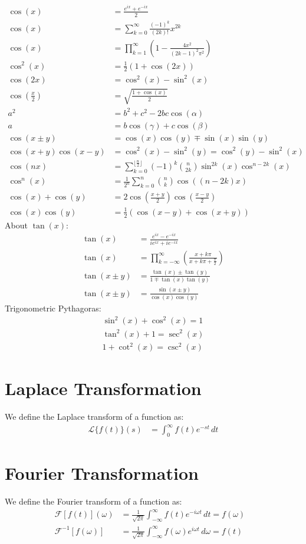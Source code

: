 \documentclass[a4paper,12pt]{article}
\begin{document}
\begin{align*}
\cos(x) &= \frac{e^{ix}+e^{-ix}}{2} \\
\cos(x) &= \sum_{k=0}^{\infty}\frac{(-1)^k}{(2k)!}x^{2k} \\
\cos(x) &= \prod_{k=1}^\infty  \left(1-\frac{4x^2}{(2k-1)^2\pi^2} \right) \\
\cos^2(x) &= \frac{1}{2}(1+\cos(2x)) \\
\cos(2x) &= \cos^2(x) - \sin^2(x)\\
\cos\left(\frac{x}{2}\right) &= \sqrt{\frac{1+\cos(x)}{2}} \\
a^2 &= b^2+c^2-2bc\cos(\alpha) \\
a &= b\cos(\gamma) + c\cos(\beta) \\
\cos(x\pm y) &= \cos(x)\cos(y)\mp\sin(x)\sin(y) \\
\cos(x+y)\cos(x-y)&=\cos^2(x)-\sin^2(y)=\cos^2(y)-\sin^2(x) \\
\cos(nx) &= \sum_{k=0}^{\lfloor\frac{n}{2}\rfloor}(-1)^k{n \choose 2k}\sin^{2k}(x)\cos^{n-2k}(x) \\
\cos^n(x)&= \frac{1}{2^n}\sum_{k=0}^n {n\choose k}\cos\left( (n-2k)x \right) \\
\cos(x)+\cos(y) &= 2\cos\left(\frac{x+y}{2}\right)\cos\left(\frac{x-y}{2}\right) \\
\cos(x)\cos(y) &= \frac{1}{2}\left(\cos(x-y)+\cos(x+y)\right)
\end{align*}
About $\tan(x)$:
\begin{align*}
\tan(x) &= \frac{e^{ix}-e^{-ix}}{ie^{ix}+ie^{-ix}} \\
\tan(x) &= \prod_{k=-\infty}^\infty \left(\frac{x+k\pi}{x+k\pi+\frac\pi2} \right) \\
\tan(x\pm y)&=\frac{\tan(x)\pm\tan(y)}{1\mp\tan(x)\tan(y)} \\
\tan(x\pm y)&=\frac{\sin(x\pm y)}{\cos(x)\cos(y)}
\end{align*}
Trigonometric Pythagoras:
\begin{align*}
\sin^2(x)+\cos^2(x)=1 \\
\tan^2(x)+1=\sec^2(x) \\
1+\cot^2(x)=\csc^2(x)
\end{align*}
\section{Laplace Transformation}
We define the Laplace transform of a function as:
\begin{align*}
\mathscr{L}\{f(t)\}(s)&=\int_0^{\infty}f(t)e^{-st}\,dt
\end{align*}
\section{Fourier Transformation}
We define the Fourier transform of a function as:
\begin{align*}
\mathcal{F}[f(t)](\omega)&=\frac{1}{\sqrt{2\pi}}\int_{-\infty}^{\infty}f(t)e^{-i\omega t}\,dt =f(\omega)& \\
\mathcal{F}^{-1}[f(\omega)] &=\frac{1}{\sqrt{2\pi}}\int_{-\infty}^{\infty}f(\omega)e^{i\omega t}\,d\omega =f(t)&
\end{align*}
\end{document}

